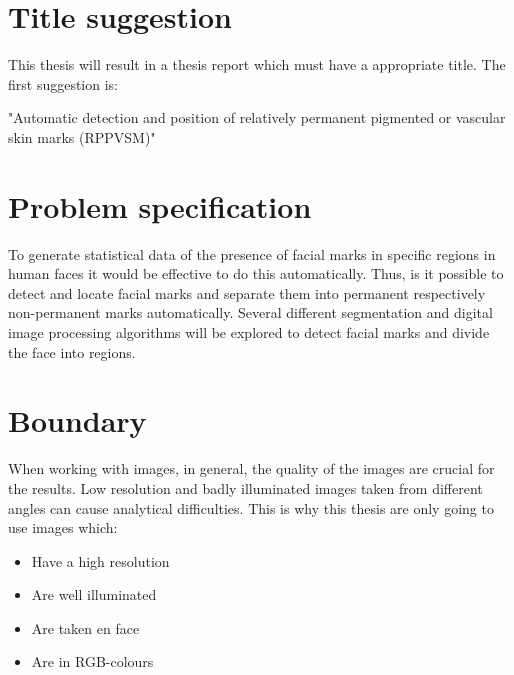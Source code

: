 \documentclass{article}
\begin{document}
\section{Title suggestion}

This thesis will result in a thesis report which must have a appropriate title. The first suggestion is: 

\begin{displayquote}
"Automatic detection and position of relatively permanent pigmented or vascular skin marks (RPPVSM)"
\end{displayquote}

\section{Problem specification}

To generate statistical data of the presence of facial marks in specific regions in human faces it would be effective to do this automatically. Thus, is it possible to detect and locate facial marks and separate them into permanent respectively non-permanent marks automatically. Several different segmentation and digital image processing algorithms will be explored to detect facial marks and divide the face into regions. 

\section{Boundary}

When working with images, in general, the quality of the images are crucial for the results. Low resolution and badly illuminated images taken from different angles can cause analytical difficulties. This is why this thesis are only going to use images which:

\begin{itemize}
	\item Have a high resolution
	\item Are well illuminated
	\item Are taken en face
	\item Are in RGB-colours 
\end{itemize}









\newpage


\end{document}
